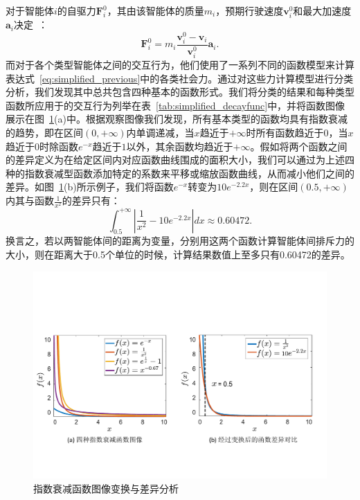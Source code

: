 对于智能体$i$的自驱力$\textbf{F}_i^0$，其由该智能体的质量$m_i$，预期行驶速度$\textbf{v}^{0}_{i}$和最大加速度$\textbf{a}_{i}$决定~\cite{helbing2000simulating}：
\begin{equation}
\label{eq:simplified_selfmotivation}
    \textbf{F}_i^0 = m_{i} \frac{\textbf{v}^{0}_{i} - \textbf{v}_{i}}{\textbf{v}^{0}_{i}} \textbf{a}_{i}.
\end{equation}
而对于各个类型智能体之间的交互行为，他们使用了一系列不同的函数模型来计算表达式~\ref{eq:simplified_previous}中的各类社会力。通过对这些力计算模型进行分类分析，我们发现其中总共包含四种基本的函数形式。我们将分类的结果和每种类型函数所应用于的交互行为列举在表~\ref{tab:simplified_decayfunc}中，并将函数图像展示在图~\ref{fig:simplified_decayfunc}(a)中。根据观察图像我们发现，所有基本类型的函数均具有指数衰减的趋势，即在区间$(0, +\infty)$内单调递减，当$x$趋近于$+\infty$时所有函数趋近于$0$，当$x$趋近于$0$时除函数$e^{-x}$趋近于$1$以外，其余函数均趋近于$+\infty$。假如将两个函数之间的差异定义为在给定区间内对应函数曲线围成的面积大小，我们可以通过为上述四种的指数衰减型函数添加特定的系数来平移或缩放函数曲线，从而减小他们之间的差异。如图~\ref{fig:simplified_decayfunc}(b)所示例子，我们将函数$e^{-x}$转变为$10e^{-2.2x}$，则在区间$(0.5, +\infty)$内其与函数$\frac{1}{x^2}$的差异只有：
\begin{equation}
\label{eq:simplified_funcdiff}
        \int_{0.5}^{+\infty} \left| \frac{1}{x^2} - 10e^{-2.2x} \right| dx \approx 0.60472.
\end{equation}
换言之，若以两智能体间的距离为变量，分别用这两个函数计算智能体间排斥力的大小，则在距离大于0.5个单位的时候，计算结果数值上至多只有0.60472的差异。



\begin{figure}[!tbh]
\centering
\includegraphics[width=\textwidth]{figure/simplified/simplified_decayfunc v2.pdf}
\caption[指数衰减函数图像变换与差异分析]{
指数衰减函数图像变换与差异分析
}
\label{fig:simplified_decayfunc}
\end{figure}


